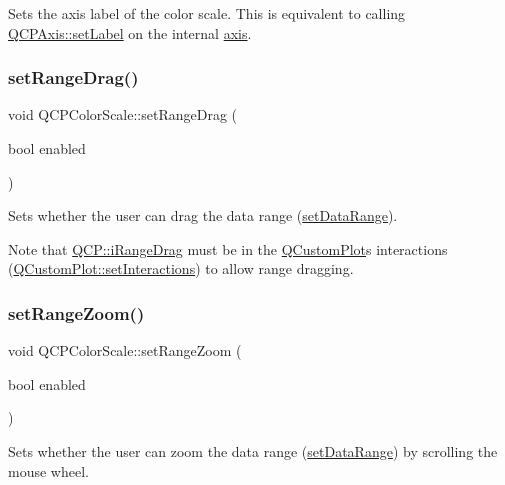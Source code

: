 Sets the axis label of the color scale. This is equivalent to calling \mbox{\hyperlink{class_q_c_p_axis_a33bcc382c111c9f31bb0687352a2dea4}{Q\+C\+P\+Axis\+::set\+Label}} on the internal \mbox{\hyperlink{class_q_c_p_color_scale_a39bdbdb3b212602a5a57f9f3ea444190}{axis}}. \mbox{\label{class_q_c_p_color_scale_a21c51a55e4fd581b6feadca9ee5b38d5}} 
\subsubsection{\texorpdfstring{set\+Range\+Drag()}{setRangeDrag()}}
{\footnotesize\ttfamily void Q\+C\+P\+Color\+Scale\+::set\+Range\+Drag (\begin{DoxyParamCaption}\item[{bool}]{enabled }\end{DoxyParamCaption})}

Sets whether the user can drag the data range (\mbox{\hyperlink{class_q_c_p_color_scale_abe88633003a26d1e756aa74984587fef}{set\+Data\+Range}}).

Note that \mbox{\hyperlink{namespace_q_c_p_a2ad6bb6281c7c2d593d4277b44c2b037a2c4432b9aceafb94000be8d1b589ef18}{Q\+C\+P\+::i\+Range\+Drag}} must be in the \mbox{\hyperlink{class_q_custom_plot}{Q\+Custom\+Plot}}\textquotesingle{}s interactions (\mbox{\hyperlink{class_q_custom_plot_a5ee1e2f6ae27419deca53e75907c27e5}{Q\+Custom\+Plot\+::set\+Interactions}}) to allow range dragging. \mbox{\label{class_q_c_p_color_scale_a96bd60fb6317ad6821841b539c93eeeb}} 
\subsubsection{\texorpdfstring{set\+Range\+Zoom()}{setRangeZoom()}}
{\footnotesize\ttfamily void Q\+C\+P\+Color\+Scale\+::set\+Range\+Zoom (\begin{DoxyParamCaption}\item[{bool}]{enabled }\end{DoxyParamCaption})}

Sets whether the user can zoom the data range (\mbox{\hyperlink{class_q_c_p_color_scale_abe88633003a26d1e756aa74984587fef}{set\+Data\+Range}}) by scrolling the mouse wheel.

